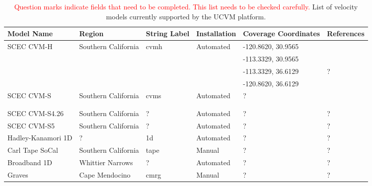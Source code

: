 
\begin{table*}[t]
\centering
\small
\caption{\textcolor{red}{Question marks indicate fields that need to be completed. This list needs to be checked carefully.} List of velocity models currently supported by the UCVM platform.}
\begin{tabular}[]{lllllp{1.25in}}
\\
Model Name         & Region                & String Label & Installation & Coverage Coordinates & References \\
\hline
SCEC CVM-H         & Southern California   & cvmh          &  Automated   & -120.8620, 30.9565 & \citet{Plesch_2011_SCEC}     \\
                   &                       &               &              & -113.3329, 30.9565 & \citet{CVM-H_Manual}         \\
                   &                       &               &              & -113.3329, 36.6129 & ?                            \\
                   &                       &               &              & -120.8620, 36.6129 &                              \\ 
SCEC CVM-S         & Southern California   & cvms          &  Automated   & ?                  & \citet{Magistrale_1996_BSSA} \\
                   &                       &               &              &                    & \citet{Magistrale_2000_BSSA} \\
                   &                       &               &              &                    & \citet{Kohler_2003_BSSA}     \\
SCEC CVM-S4.26     & Southern California   & ?             &  Automated   & ?                  & ?                            \\
SCEC CVM-S5        & Southern California   & ?             &  Automated   & ?                  & ?                            \\
Hadley-Kanamori 1D & ?                     & 1d            &  Automated   & ?                  & ?                            \\
Carl Tape SoCal    & Southern California   & tape          &  Manual      & ?                  & ?                            \\
Broadband 1D       & Whittier Narrows      & ?             &  Automated   & ?                  & ?                            \\
Graves             & Cape Mendocino        & cmrg          &  Manual      & ?                  & ?                            \\

\end{tabular}
\end{table*}
